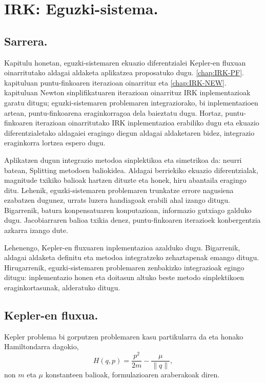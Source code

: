 \chapter{IRK: Eguzki-sistema.}


\section{Sarrera.}
  

Kapitulu honetan, eguzki-sistemaren ekuazio diferentzialei Kepler-en fluxuan oinarritutako aldagai aldaketa aplikatzea proposatuko dugu. \ref{chap:IRK-PF}. kapituluan puntu-finkoaren iterazioan oinarrituz eta \ref{chap:IRK-NEW}. kapituluan Newton sinplifikatuaren iterazioan oinarrituz IRK inplementazioak garatu ditugu; eguzki-sistemaren problemaren integraziorako, bi inplementazioen artean, puntu-finkoarena eraginkorragoa dela baieztatu dugu. Hortaz, puntu-finkoaren iterazioan oinarritutako IRK inplementazioa erabiliko dugu eta  ekuazio diferentzialetako aldagaiei eragingo diegun aldagai aldaketaren bidez, integrazio eraginkorra lortzea espero dugu.  

Aplikatzen dugun integrazio metodoa sinplektikoa eta simetrikoa da: neurri batean, Splitting metodoen baliokidea. Aldagai berriekiko ekuazio diferentzialak, magnitude txikiko balioak hartzen dituzte eta honek, hiru abantaila eragingo ditu. Lehenik, eguzki-sistemaren problemaren trunkatze errore nagusiena ezabatzen dugunez, urrats luzera handiagoak erabili ahal izango ditugu. Bigarrenik, batura konpensatuaren konputazioan, informazio gutxiago galduko dugu. Jacobiarraren balioa txikia denez, puntu-finkoaren iterazioek konbergentzia azkarra izango dute. 

Lehenengo, Kepler-en fluxuaren inplementazioa azalduko dugu. Bigarrenik, aldagai aldaketa definitu eta metodoa integratzeko zehaztapenak emango ditugu. Hirugarrenik, eguzki-sistemaren problemaren zenbakizko integrazioak egingo ditugu: inplementazio honen eta doitasun altuko beste metodo sinplektikoen eraginkortasunak, alderatuko ditugu.     

 

\section{Kepler-en fluxua.}
   
   
Kepler problema bi gorputzen problemaren kasu partikularra da eta  honako Hamiltondarra dagokio,
\begin{equation}
H(q,p)=\frac{p^2}{2m}-\frac{\mu}{\|q\|},
\end{equation}
non $m$ eta $\mu$ konstanteen balioak, formulazioaren araberakoak diren.

